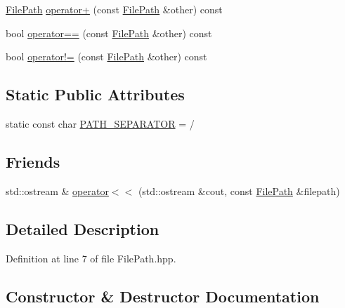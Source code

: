 \begin{DoxyCompactItemize}
\item 
\hyperlink{classglimac_1_1_file_path}{File\+Path} \hyperlink{classglimac_1_1_file_path_a8113825c73d8a8f1f1cf3ca57de6bad8}{operator+} (const \hyperlink{classglimac_1_1_file_path}{File\+Path} \&other) const
\item 
bool \hyperlink{classglimac_1_1_file_path_a1d7c3a1f124fe5e637d7584a46ceef91}{operator==} (const \hyperlink{classglimac_1_1_file_path}{File\+Path} \&other) const
\item 
bool \hyperlink{classglimac_1_1_file_path_aa1806dd19789add295b934e4ab52b296}{operator!=} (const \hyperlink{classglimac_1_1_file_path}{File\+Path} \&other) const
\end{DoxyCompactItemize}
\subsection*{Static Public Attributes}
\begin{DoxyCompactItemize}
\item 
static const char \hyperlink{classglimac_1_1_file_path_a011d614268133b82be0d0596e15a4648}{P\+A\+T\+H\+\_\+\+S\+E\+P\+A\+R\+A\+T\+OR} = \textquotesingle{}/\textquotesingle{}
\end{DoxyCompactItemize}
\subsection*{Friends}
\begin{DoxyCompactItemize}
\item 
std\+::ostream \& \hyperlink{classglimac_1_1_file_path_a924c4e68c4618cf40156646d23ec5f1c}{operator$<$$<$} (std\+::ostream \&cout, const \hyperlink{classglimac_1_1_file_path}{File\+Path} \&filepath)
\end{DoxyCompactItemize}


\subsection{Detailed Description}


Definition at line 7 of file File\+Path.\+hpp.



\subsection{Constructor \& Destructor Documentation}
\mbox{\label{classglimac_1_1_file_path_a1e7e80bf7ccc6b099efd6fa049374150}} 
